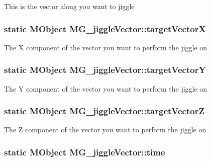 This is the vector along you want to jiggle \hypertarget{class_m_g__jiggle_vector_aa16f19dc9c8b90569fdf39bfd6c9fd9e}{
\subsubsection[{target\-Vector\-X}]{\setlength{\rightskip}{0pt plus 5cm}static M\-Object M\-G\-\_\-jiggle\-Vector\-::target\-Vector\-X\hspace{0.3cm}{\ttfamily [static]}}}\label{class_m_g__jiggle_vector_aa16f19dc9c8b90569fdf39bfd6c9fd9e}
The X component of the vector you want to perform the jiggle on \hypertarget{class_m_g__jiggle_vector_a075829bfac84e90a655e09dbf025e04f}{
\subsubsection[{target\-Vector\-Y}]{\setlength{\rightskip}{0pt plus 5cm}static M\-Object M\-G\-\_\-jiggle\-Vector\-::target\-Vector\-Y\hspace{0.3cm}{\ttfamily [static]}}}\label{class_m_g__jiggle_vector_a075829bfac84e90a655e09dbf025e04f}
The Y component of the vector you want to perform the jiggle on \hypertarget{class_m_g__jiggle_vector_aa1755e674e4bb7b580cf671eda0972b5}{
\subsubsection[{target\-Vector\-Z}]{\setlength{\rightskip}{0pt plus 5cm}static M\-Object M\-G\-\_\-jiggle\-Vector\-::target\-Vector\-Z\hspace{0.3cm}{\ttfamily [static]}}}\label{class_m_g__jiggle_vector_aa1755e674e4bb7b580cf671eda0972b5}
The Z component of the vector you want to perform the jiggle on \hypertarget{class_m_g__jiggle_vector_a015c3c6cc0881e95de079788971e1f58}{
\subsubsection[{time}]{\setlength{\rightskip}{0pt plus 5cm}static M\-Object M\-G\-\_\-jiggle\-Vector\-::time\hspace{0.3cm}{\ttfamily [static]}}}\label{class_m_g__jiggle_vector_a015c3c6cc0881e95de079788971e1f58}
